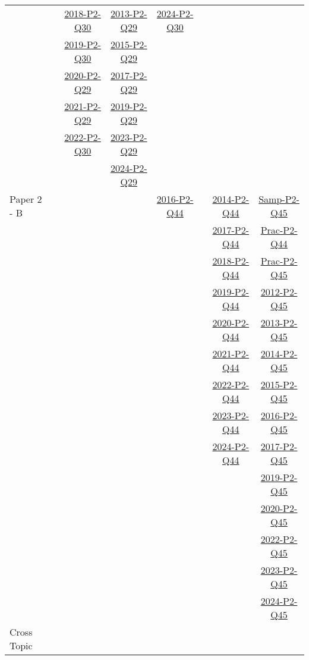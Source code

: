\documentclass[12pt, a4paper]{article}
\begin{document}
\begin{absolutelynopagebreak}
\begin{center}
\begin{tabular}{|l|c|c|c|c|c|c|c|}
&  & \hyperref[DSE2018-CoreP2-Q30]{2018-P2-Q30} & \hyperref[DSE2013-CoreP2-Q29]{2013-P2-Q29} & \hyperref[DSE2024-CoreP2-Q30]{2024-P2-Q30} &  &  &  \\
&  & \hyperref[DSE2019-CoreP2-Q30]{2019-P2-Q30} & \hyperref[DSE2015-CoreP2-Q29]{2015-P2-Q29} &  &  &  &  \\
&  & \hyperref[DSE2020-CoreP2-Q29]{2020-P2-Q29} & \hyperref[DSE2017-CoreP2-Q29]{2017-P2-Q29} &  &  &  &  \\
&  & \hyperref[DSE2021-CoreP2-Q29]{2021-P2-Q29} & \hyperref[DSE2019-CoreP2-Q29]{2019-P2-Q29} &  &  &  &  \\
&  & \hyperref[DSE2022-CoreP2-Q30]{2022-P2-Q30} & \hyperref[DSE2023-CoreP2-Q29]{2023-P2-Q29} &  &  &  &  \\
&  &  & \hyperref[DSE2024-CoreP2-Q29]{2024-P2-Q29} &  &  &  &  \\
\hline
Paper 2 - B&  &  &  & \hyperref[DSE2016-CoreP2-Q44]{2016-P2-Q44} &  & \hyperref[DSE2014-CoreP2-Q44]{2014-P2-Q44} & \hyperref[DSE2012S-CoreP2-Q45]{Samp-P2-Q45} \\
&  &  &  &  &  & \hyperref[DSE2017-CoreP2-Q44]{2017-P2-Q44} & \hyperref[DSE2012P-CoreP2-Q44]{Prac-P2-Q44} \\
&  &  &  &  &  & \hyperref[DSE2018-CoreP2-Q44]{2018-P2-Q44} & \hyperref[DSE2012P-CoreP2-Q45]{Prac-P2-Q45} \\
&  &  &  &  &  & \hyperref[DSE2019-CoreP2-Q44]{2019-P2-Q44} & \hyperref[DSE2012-CoreP2-Q45]{2012-P2-Q45} \\
&  &  &  &  &  & \hyperref[DSE2020-CoreP2-Q44]{2020-P2-Q44} & \hyperref[DSE2013-CoreP2-Q45]{2013-P2-Q45} \\
&  &  &  &  &  & \hyperref[DSE2021-CoreP2-Q44]{2021-P2-Q44} & \hyperref[DSE2014-CoreP2-Q45]{2014-P2-Q45} \\
&  &  &  &  &  & \hyperref[DSE2022-CoreP2-Q44]{2022-P2-Q44} & \hyperref[DSE2015-CoreP2-Q45]{2015-P2-Q45} \\
&  &  &  &  &  & \hyperref[DSE2023-CoreP2-Q44]{2023-P2-Q44} & \hyperref[DSE2016-CoreP2-Q45]{2016-P2-Q45} \\
&  &  &  &  &  & \hyperref[DSE2024-CoreP2-Q44]{2024-P2-Q44} & \hyperref[DSE2017-CoreP2-Q45]{2017-P2-Q45} \\
&  &  &  &  &  &  & \hyperref[DSE2019-CoreP2-Q45]{2019-P2-Q45} \\
&  &  &  &  &  &  & \hyperref[DSE2020-CoreP2-Q45]{2020-P2-Q45} \\
&  &  &  &  &  &  & \hyperref[DSE2022-CoreP2-Q45]{2022-P2-Q45} \\
&  &  &  &  &  &  & \hyperref[DSE2023-CoreP2-Q45]{2023-P2-Q45} \\
&  &  &  &  &  &  & \hyperref[DSE2024-CoreP2-Q45]{2024-P2-Q45} \\
\hline
\hline
Cross Topic&  &  &  &  &  &  &  \\
\hline
\end{tabular}
\end{center}
\end{absolutelynopagebreak}
\end{document}
